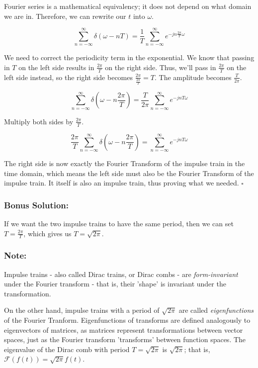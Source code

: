 \documentclass{article}
\begin{document}
Fourier series is a mathematical equivalency; it does not depend on what domain we are in. Therefore, we can rewrite our $t$ into $\omega$.

\[
\sum_{n = -\infty}^{\infty} \delta(\omega-nT) = \frac{1}{T}\sum_{n = -\infty}^{\infty}e^{-jn\frac{2\pi}{T}\omega}
\]

We need to correct the periodicity term in the exponential. We know that passing in $T$ on the left side results in $\frac{2\pi}{T}$ on the right side. Thus, we'll pass in $\frac{2\pi}{T}$ on the left side instead, so the right side becomes $\frac{2\pi}{\frac{2\pi}{T}} = T$. The amplitude becomes $\frac{T}{2\pi}$.

\[
\sum_{n = -\infty}^{\infty} \delta(\omega-n\frac{2\pi}{T}) = \frac{T}{2\pi}\sum_{n = -\infty}^{\infty}e^{-jnT\omega}
\]

Multiply both sides by $\frac{2\pi}{T}$.

\[
\frac{2\pi}{T} \sum_{n = -\infty}^{\infty} \delta(\omega-n\frac{2\pi}{T}) = \sum_{n = -\infty}^{\infty}e^{-jnT\omega}
\]

The right side is now exactly the Fourier Transform of the impulse train in the time domain, which means the left side must also be the Fourier Transform of the impulse train. It itself is also an impulse train, thus proving what we needed. $\square$

\subsubsection{Bonus Solution:}

If we want the two impulse trains to have the same period, then we can set $T = \frac{2\pi}{T}$, which gives us $T = \sqrt{2\pi}$.

\subsubsection{Note:}
Impulse trains - also called Dirac trains, or Dirac combs - are \textit{form-invariant} under the Fourier transform - that is, their 'shape' is invariant under the transformation.

On the other hand, impulse trains with a period of $\sqrt{2\pi}$ are called \textit{eigenfunctions} of the Fourier Tranform. Eigenfunctions of transforms are defined analogously to eigenvectors of matrices, as matrices represent transformations between vector spaces, just as the Fourier transform 'transforms' between function spaces. The eigenvalue of the Dirac comb with period $T = \sqrt{2\pi}$ is $\sqrt{2\pi}$; that is, $\mathcal{F}(f(t)) = \sqrt{2\pi} f(t)$.
\end{document}
